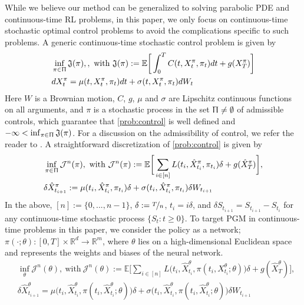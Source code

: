 \documentclass{article}
\numberwithin{equation}{section}
\begin{document}
While we believe our method can be generalized to solving parabolic PDE and continuous-time RL problems, in this paper, we only focus on continuous-time stochastic optimal control problems to avoid the complications specific to such problems.
A generic continuous-time stochastic control problem is given by
\begin{equation}\label{prob:control}
\begin{split}
    &\inf_{\pi\in\Uppi}\mathfrak{J}(\pi), ,~\textrm{with}~\mathfrak{J}(\pi):=\mathbb{E}\bigg[\int_0^TC(t,X^\pi_t,\pi_t)dt + g(X_T^{\pi})\bigg]\\
    &dX^\pi_t=\mu(t,X_t^{\pi},\pi_t)dt+\sigma(t,X_t^{\pi},\pi_t)dW_t
\end{split}
\end{equation}
Here $W$ is a Brownian motion, $C$, $g$, $\mu$ and $\sigma$ are Lipschitz continuous functions on all arguments, and  $\pi$ is a stochastic process in the set $\Uppi\neq\emptyset$  of admissible controls, which guarantee that \eqref{prob:control} is well defined and $-\infty<\inf_{\pi\in\Uppi}\mathfrak{J}(\pi)$. For a discussion on the admissibility of control, we refer the reader to \citet[Chapters I, III, and IV]{FS06}.
A straightforward discretization of \eqref{prob:control} is given by
\begin{align}
        & \inf_{\pi\in\Uppi}{\mathcal{J}}^n(\pi),~\textrm{with}~{\mathcal{J}}^n(\pi):=\mathbb{E}\bigg[\sum_{i\in[n]}L(t_i,\hat X^{\pi}_{t_i},\pi_{t_i})\delta + g(\hat{X}_T^\pi)\bigg],\label{prob:control_discretized}\\
        &\delta \hat{X}^\pi_{t_{i+1}}:=\mu(t_i,\hat{X}_{t_i}^\pi,\pi_{t_i}) \delta+ \sigma(t_i,\hat{X}_{t_i}^\pi,\pi_{t_i})\delta W_{t_{i+1}}\label{Euler-Maruyama}
\end{align}
In the above, $[n]:=\{0,...,n-1\}$, $\delta :=\nicefrac{T}{n}$, $t_i=i\delta$,  and $\delta {S}_{t_{i+1}}={S}_{t_{i+1}}-S_{t_i}$  for any continuous-time stochastic process $\{S_t:t\ge0\}$. 
To target PGM in continuous-time problems in this paper, we consider the policy as a network; $\pi(\cdot;\theta):[0,T]\times\mathbb{R}^d\to \mathbb{R}^m$, where $\theta$ lies on a high-dimensional Euclidean space and represents the weights and biases of the neural network. 
\begin{equation}
        \begin{split}
        & \inf_\theta{\mathcal{J}}^n(\theta),~\textrm{with}~{\mathcal{J}}^n(\theta):=\mathbb{E}\bigg[\sum_{i\in[n]}L\big(t_i,\hat X^{\theta}_{t_i}, \pi({t_i},X^{\theta}_{t_i};\theta) \big) \delta + g(\hat{X}_T^\theta)\bigg],\\
        &\delta \hat{X}^\theta_{t_{i+1}}=\mu\big(t_i,\hat{X}_{t_i}^\theta,\pi(t_i,\hat{X}_{t_i}^\theta;\theta)\big)\delta +\sigma\big(t_i,\hat{X}_{t_i}^\theta, \pi(t_i,\hat{X}_{t_i}^\theta;\theta)\big) \delta W_{t_{i+1}}
        \end{split}
\end{equation}
\end{document}
